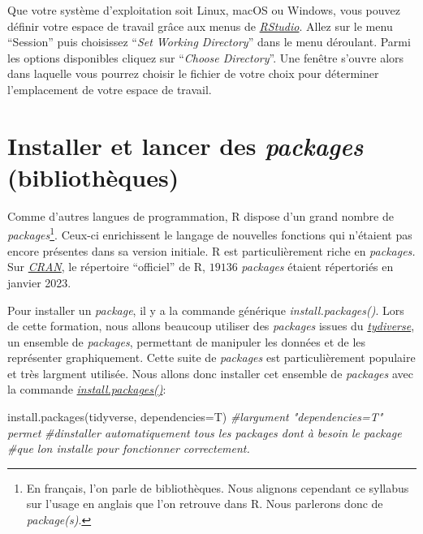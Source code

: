 \documentclass[
]{book}
\newenvironment{Shaded}{\begin{snugshade}}{\end{snugshade}}
\newcommand{\AttributeTok}[1]{\textcolor[rgb]{0.77,0.63,0.00}{#1}}
\newcommand{\CommentTok}[1]{\textcolor[rgb]{0.56,0.35,0.01}{\textit{#1}}}
\newcommand{\FunctionTok}[1]{\textcolor[rgb]{0.00,0.00,0.00}{#1}}
\newcommand{\NormalTok}[1]{#1}
\begin{document}
Que votre système d'exploitation soit Linux, macOS ou Windows, vous pouvez définir votre espace de travail grâce aux menus de \href{https://posit.co/}{\emph{RStudio}}. Allez sur le menu ``Session'' puis choisissez ``\emph{Set Working Directory}'' dans le menu déroulant. Parmi les options disponibles cliquez sur ``\emph{Choose Directory}''. Une fenêtre s'ouvre alors dans laquelle vous pourrez choisir le fichier de votre choix pour déterminer l'emplacement de votre espace de travail.

\hypertarget{packages}{%
\section{\texorpdfstring{Installer et lancer des \emph{packages} (bibliothèques)}{Installer et lancer des packages (bibliothèques)}}\label{packages}}

Comme d'autres langues de programmation, R dispose d'un grand nombre de \emph{packages}\footnote{En français, l'on parle de bibliothèques. Nous alignons cependant ce syllabus sur l'usage en anglais que l'on retrouve dans R. Nous parlerons donc de \emph{package(s)}.}. Ceux-ci enrichissent le langage de nouvelles fonctions qui n'étaient pas encore présentes dans sa version initiale. R est particulièrement riche en \emph{packages.} Sur \href{https://cran.r-project.org/}{\emph{CRAN}}, le répertoire ``officiel'' de R, \(19136\) \emph{packages} étaient répertoriés en janvier 2023.

Pour installer un \emph{package}, il y a la commande générique \emph{install.packages()}. Lors de cette formation, nous allons beaucoup utiliser des \emph{packages} issues du \href{https://www.tidyverse.org/}{\emph{tydiverse}}, un ensemble de \emph{packages}, permettant de manipuler les données et de les représenter graphiquement. Cette suite de \emph{packages} est particulièrement populaire et très largment utilisée. Nous allons donc installer cet ensemble de \emph{packages} avec la commande \href{https://www.rdocumentation.org/packages/utils/versions/3.6.2/topics/install.packages}{\emph{install.packages()}}:

\begin{Shaded}
\begin{Highlighting}[]
\FunctionTok{install.packages}\NormalTok{(tidyverse, }\AttributeTok{dependencies=}\NormalTok{T) }\CommentTok{\#l\textquotesingle{}argument "dependencies=T" permet}
        \CommentTok{\#d\textquotesingle{}installer automatiquement tous les packages dont à besoin le package}
        \CommentTok{\#que l\textquotesingle{}on installe pour fonctionner correctement.}
\end{Highlighting}
\end{Shaded}
\end{document}
